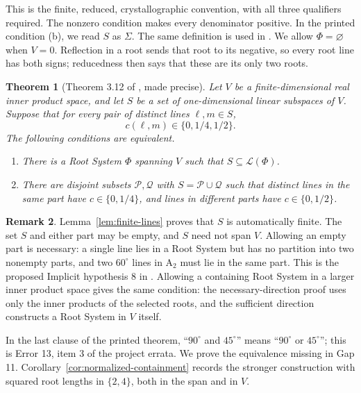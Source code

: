 \documentclass[11pt]{amsart}
\newcommand\cL{{\mathcal L}}
\newcommand\cP{{\mathcal P}}
\newcommand\cQ{{\mathcal Q}}
\newcommand\sbs{\subseteq}
\newtheorem{theorem}{Theorem}[section]
\theoremstyle{definition}
\newtheorem{remark}[theorem]{Remark}
\newcommand{\typ}[1]{\mathrm{#1}}
\DeclareRobustCommand{\ml}[1]{\ifmmode\text{\normalfont\small\ttfamily\detokenize{#1}}\else{\normalfont\small\nolinkurl{#1}}\fi}
\begin{document}
This is the finite, reduced, crystallographic convention, with all three
qualifiers required. The nonzero condition makes every denominator
positive. In the printed condition (b), we read $S$ as $\Sigma$.
The same definition is used in \cite[Theorems A--C]{R311}.
We allow $\Phi=\varnothing$ when $V=0$. Reflection in a root sends
that root to its negative, so every root line has both signs; reducedness
then says that these are its only two roots.

\begin{theorem}[Theorem 3.12 of \cite{CGSS}, made precise]\label{thm:main}
Let $V$ be a finite-dimensional real inner product space, and let $S$ be
a set of one-dimensional linear subspaces of $V$. Suppose that for every
pair of distinct lines $\ell,m\in S$,
\[
 c(\ell,m)\in\{0,1/4,1/2\}.
\]
The following conditions are equivalent.
\begin{enumerate}
\item There is a Root System $\Phi$ spanning $V$ such that
      $S\sbs\cL(\Phi)$.
\item There are disjoint subsets $\cP,\cQ$ with
      $S=\cP\cup\cQ$ such that distinct lines in the same part have
      $c\in\{0,1/4\}$, and lines in different parts have
      $c\in\{0,1/2\}$.
\end{enumerate}
\end{theorem}

\begin{remark}\label{rem:conventions}
Lemma~\ref{lem:finite-lines} proves that $S$ is automatically finite.
The set $S$ and either part may be empty, and $S$ need not span $V$.
Allowing an empty part is necessary: a single line lies in a Root System
but has no partition into two nonempty parts, and two $60^\circ$ lines
in $\typ A_2$ must lie in the same part.
This is the proposed Implicit hypothesis 8 in \ml{cgss/errata.md}.
Allowing a containing Root System in a larger inner product space gives
the same condition: the necessary-direction proof uses only the inner
products of the selected roots, and the sufficient direction constructs
a Root System in $V$ itself.
\end{remark}

In the last clause of the
printed theorem, ``$90^\circ$ and $45^\circ$'' means
``$90^\circ$ or $45^\circ$''; this is Error 13, item 3 of the project
errata. We prove the equivalence missing in Gap 11.
Corollary~\ref{cor:normalized-containment} records the stronger construction
with squared root lengths in $\{2,4\}$, both in the span and in $V$.
\end{document}
